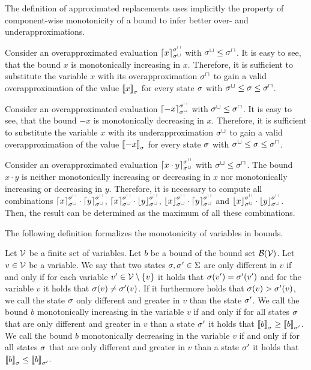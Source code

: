 \begin{example}
  The definition of approximated replacements uses implicitly the property of component-wise monotonicity of a bound to infer better over- and underapproximations.

  Consider an overapproximated evaluation $\left\lceil x \right\rceil^{{\sigma^\sqcap}}_{{\sigma^\sqcup}}$ with ${\sigma^\sqcup} \leq {\sigma^\sqcap}$.
  It is easy to see, that the bound $x$ is monotonically increasing in $x$.
  Therefore, it is sufficient to substitute the variable $x$ with its overapproximation ${\sigma^\sqcap}$ to gain a valid overapproximation of the value $\left\llbracket x \right\rrbracket_{\sigma}$ for every state $\sigma$ with ${\sigma^\sqcup} \leq \sigma \leq {\sigma^\sqcap}$.
  
  Consider an overapproximated evaluation $\left\lceil -x \right\rceil^{{\sigma^\sqcap}}_{{\sigma^\sqcup}}$ with ${\sigma^\sqcup} \leq {\sigma^\sqcap}$.
  It is easy to see, that the bound $-x$ is monotonically decreasing in $x$.
  Therefore, it is sufficient to substitute the variable $x$ with its underapproximation ${\sigma^\sqcup}$ to gain a valid overapproximation of the value $\left\llbracket -x \right\rrbracket_{\sigma}$ for every state $\sigma$ with ${\sigma^\sqcup} \leq \sigma \leq {\sigma^\sqcap}$.
  
  Consider an overapproximated evaluation $\left\lceil x \cdot y \right\rceil^{{\sigma^\sqcap}}_{{\sigma^\sqcup}}$ with ${\sigma^\sqcup} \leq {\sigma^\sqcap}$.
  The bound $x \cdot y$ is neither monotonically increasing or decreasing in $x$ nor monotonically increasing or decreasing in $y$.
  Therefore, it is necessary to compute all combinations $\left\lceil x \right\rceil^{{\sigma^\sqcap}}_{{\sigma^\sqcup}} \cdot \left\lceil y \right\rceil^{{\sigma^\sqcap}}_{{\sigma^\sqcup}}$, $\left\lceil x \right\rceil^{{\sigma^\sqcap}}_{{\sigma^\sqcup}} \cdot \left\lfloor y \right\rfloor^{{\sigma^\sqcap}}_{{\sigma^\sqcup}}$, $\left\lfloor x \right\rfloor^{{\sigma^\sqcap}}_{{\sigma^\sqcup}} \cdot \left\lceil y \right\rceil^{{\sigma^\sqcap}}_{{\sigma^\sqcup}}$ and $\left\lfloor x \right\rfloor^{{\sigma^\sqcap}}_{{\sigma^\sqcup}} \cdot \left\lfloor y \right\rfloor^{{\sigma^\sqcap}}_{{\sigma^\sqcup}}$.
  Then, the result can be determined as the maximum of all these combinations.
\end{example}

The following definition formalizes the monotonicity of variables in bounds.

\begin{definition}
  Let $\mathcal{V}$ be a finite set of variables.
  Let $b$ be a bound of the bound set $\mathcal{B}(\mathcal{V})$.
  Let $v \in \mathcal{V}$ be a variable.
  We say that two states $\sigma, \sigma' \in \Sigma$ are only different in $v$ if and only if for each variable $v' \in \mathcal{V} \setminus \lbrace v \rbrace$ it holds that $\sigma(v') = \sigma'(v')$ and for the variable $v$ it holds that $\sigma(v) \neq \sigma'(v)$.
  If it furthermore holds that $\sigma(v) > \sigma'(v)$, we call the state $\sigma$ only different and greater in $v$ than the state $\sigma'$.
  We call the bound $b$ monotonically increasing in the variable $v$ if and only if for all states $\sigma$ that are only different and greater in $v$ than a state $\sigma'$ it holds that $\left\llbracket b \right\rrbracket_{\sigma} \geq \left\llbracket b \right\rrbracket_{\sigma'}$.
  We call the bound $b$ monotonically decreasing in the variable $v$ if and only if for all states $\sigma$ that are only different and greater in $v$ than a state $\sigma'$ it holds that $\left\llbracket b \right\rrbracket_{\sigma} \leq \left\llbracket b \right\rrbracket_{\sigma'}$.
\end{definition}

